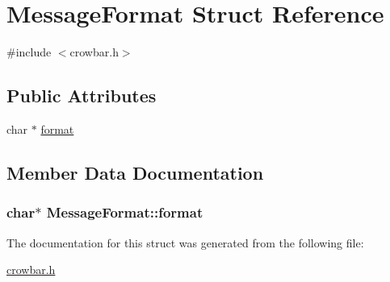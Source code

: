 \hypertarget{struct_message_format}{}\section{Message\+Format Struct Reference}
\label{struct_message_format}


{\ttfamily \#include $<$crowbar.\+h$>$}

\subsection*{Public Attributes}
\begin{DoxyCompactItemize}
\item 
char $\ast$ \hyperlink{struct_message_format_a493d7da4c1046232811f5cce284282d9}{format}
\end{DoxyCompactItemize}


\subsection{Member Data Documentation}
\hypertarget{struct_message_format_a493d7da4c1046232811f5cce284282d9}{}
\subsubsection[{format}]{\setlength{\rightskip}{0pt plus 5cm}char$\ast$ Message\+Format\+::format}\label{struct_message_format_a493d7da4c1046232811f5cce284282d9}


The documentation for this struct was generated from the following file\+:\begin{DoxyCompactItemize}
\item 
\hyperlink{crowbar_8h}{crowbar.\+h}\end{DoxyCompactItemize}
